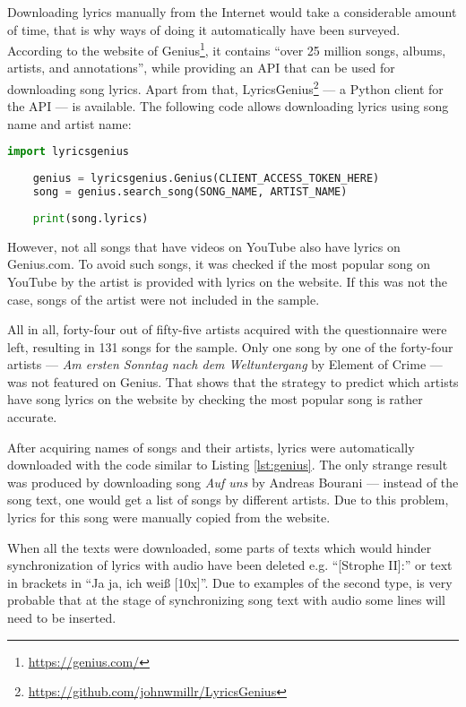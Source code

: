 Downloading lyrics manually from the Internet would take a considerable amount of time, that is why ways of doing it automatically have been surveyed. According to the website of Genius\footnote{\url{https://genius.com/}}, it contains ``over 25 million songs, albums, artists, and annotations'', while providing an API that can be used for downloading song lyrics. Apart from that, LyricsGenius\footnote{\url{https://github.com/johnwmillr/LyricsGenius}} --- a Python client for the API --- is available. The following code allows downloading lyrics using song name and artist name:

\begin{lstlisting}[language=Python, caption={Downloading song lyrics}, label={lst:genius}]
    import lyricsgenius
    
    genius = lyricsgenius.Genius(CLIENT_ACCESS_TOKEN_HERE)
    song = genius.search_song(SONG_NAME, ARTIST_NAME)
    
    print(song.lyrics)
\end{lstlisting}

However, not all songs that have videos on YouTube also have lyrics on Genius.com. To avoid such songs, it was checked if the most popular song on YouTube by the artist is provided with lyrics on the website. If this was not the case, songs of the artist were not included in the sample. 

All in all, forty-four out of fifty-five artists acquired with the questionnaire were left, resulting in 131 songs for the sample. Only one song by one of the forty-four artists --- \textit{Am ersten Sonntag nach dem Weltuntergang} by Element of Crime --- was not featured on Genius. That shows that the strategy to predict which artists have song lyrics on the website by checking the most popular song is rather accurate.

After acquiring names of songs and their artists, lyrics were automatically downloaded with the code similar to Listing \ref{lst:genius}. The only strange result was produced by downloading song \textit{Auf uns} by Andreas Bourani --- instead of the song text, one would get a list of songs by different artists. Due to this problem, lyrics for this song were manually copied from the website. 

When all the texts were downloaded, some parts of texts which would hinder synchronization of lyrics with audio have been deleted e.g. ``[Strophe II]:'' or text in brackets in ``Ja ja, ich weiß [10x]''. Due to examples of the second type, is very probable that at the stage of synchronizing song text with audio some lines will need to be inserted.
